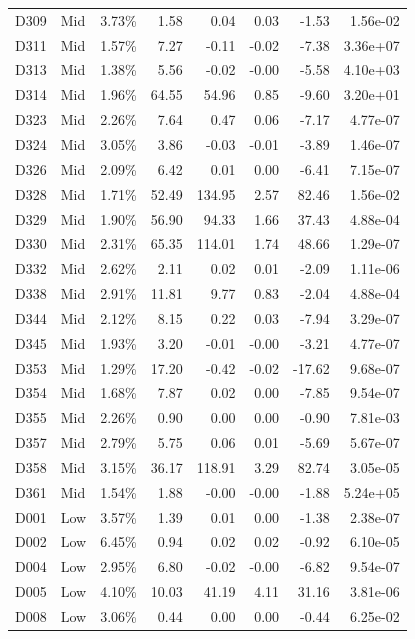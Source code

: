 \begin{tabular}{l l r r r r r r}
D309 & Mid & 3.73\% & 1.58 & 0.04 & 0.03 & -1.53 & 1.56e-02 \\
D311 & Mid & 1.57\% & 7.27 & -0.11 & -0.02 & -7.38 & 3.36e+07 \\
D313 & Mid & 1.38\% & 5.56 & -0.02 & -0.00 & -5.58 & 4.10e+03 \\
D314 & Mid & 1.96\% & 64.55 & 54.96 & 0.85 & -9.60 & 3.20e+01 \\
D323 & Mid & 2.26\% & 7.64 & 0.47 & 0.06 & -7.17 & 4.77e-07 \\
D324 & Mid & 3.05\% & 3.86 & -0.03 & -0.01 & -3.89 & 1.46e-07 \\
D326 & Mid & 2.09\% & 6.42 & 0.01 & 0.00 & -6.41 & 7.15e-07 \\
D328 & Mid & 1.71\% & 52.49 & 134.95 & 2.57 & 82.46 & 1.56e-02 \\
D329 & Mid & 1.90\% & 56.90 & 94.33 & 1.66 & 37.43 & 4.88e-04 \\
D330 & Mid & 2.31\% & 65.35 & 114.01 & 1.74 & 48.66 & 1.29e-07 \\
D332 & Mid & 2.62\% & 2.11 & 0.02 & 0.01 & -2.09 & 1.11e-06 \\
D338 & Mid & 2.91\% & 11.81 & 9.77 & 0.83 & -2.04 & 4.88e-04 \\
D344 & Mid & 2.12\% & 8.15 & 0.22 & 0.03 & -7.94 & 3.29e-07 \\
D345 & Mid & 1.93\% & 3.20 & -0.01 & -0.00 & -3.21 & 4.77e-07 \\
D353 & Mid & 1.29\% & 17.20 & -0.42 & -0.02 & -17.62 & 9.68e-07 \\
D354 & Mid & 1.68\% & 7.87 & 0.02 & 0.00 & -7.85 & 9.54e-07 \\
D355 & Mid & 2.26\% & 0.90 & 0.00 & 0.00 & -0.90 & 7.81e-03 \\
D357 & Mid & 2.79\% & 5.75 & 0.06 & 0.01 & -5.69 & 5.67e-07 \\
D358 & Mid & 3.15\% & 36.17 & 118.91 & 3.29 & 82.74 & 3.05e-05 \\
D361 & Mid & 1.54\% & 1.88 & -0.00 & -0.00 & -1.88 & 5.24e+05 \\
D001 & Low & 3.57\% & 1.39 & 0.01 & 0.00 & -1.38 & 2.38e-07 \\
D002 & Low & 6.45\% & 0.94 & 0.02 & 0.02 & -0.92 & 6.10e-05 \\
D004 & Low & 2.95\% & 6.80 & -0.02 & -0.00 & -6.82 & 9.54e-07 \\
D005 & Low & 4.10\% & 10.03 & 41.19 & 4.11 & 31.16 & 3.81e-06 \\
D008 & Low & 3.06\% & 0.44 & 0.00 & 0.00 & -0.44 & 6.25e-02 \\

\end{tabular}
